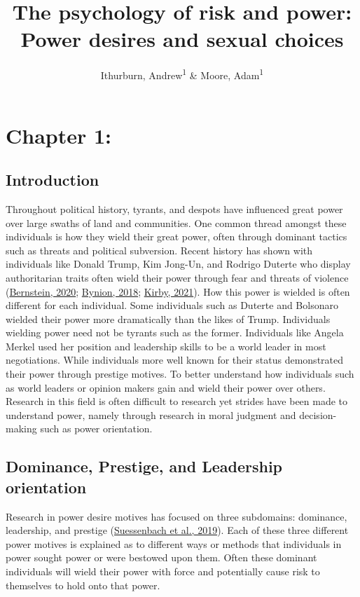 \documentclass[
  donotrepeattitle,doc, 12pt, a4paper,floatsintext]{apa7}
\title{The psychology of risk and power: Power desires and sexual choices}
\author{Ithurburn, Andrew\textsuperscript{1} \& Moore, Adam\textsuperscript{1}}
\date{}
\affiliation{\vspace{0.5cm}\textsuperscript{1} The University of Edinburgh}
\begin{document}
\maketitle

\hypertarget{chapter-1}{%
\section{Chapter 1:}\label{chapter-1}}

\hypertarget{introduction}{%
\subsection{Introduction}\label{introduction}}

Throughout political history, tyrants, and despots have influenced great power over large swaths of land and communities. One common thread amongst these individuals is how they wield their great power, often through dominant tactics such as threats and political subversion. Recent history has shown with individuals like Donald Trump, Kim Jong-Un, and Rodrigo Duterte who display authoritarian traits often wield their power through fear and threats of violence (\protect\hyperlink{ref-bernstein2020}{Bernstein, 2020}; \protect\hyperlink{ref-bynion2018}{Bynion, 2018}; \protect\hyperlink{ref-kirby2021}{Kirby, 2021}). How this power is wielded is often different for each individual. Some individuals such as Duterte and Bolsonaro wielded their power more dramatically than the likes of Trump. Individuals wielding power need not be tyrants such as the former. Individuals like Angela Merkel used her position and leadership skills to be a world leader in most negotiations. While individuals more well known for their status demonstrated their power through prestige motives. To better understand how individuals such as world leaders or opinion makers gain and wield their power over others. Research in this field is often difficult to research yet strides have been made to understand power, namely through research in moral judgment and decision-making such as power orientation.

\hypertarget{dominance-prestige-and-leadership-orientation}{%
\subsection{Dominance, Prestige, and Leadership orientation}\label{dominance-prestige-and-leadership-orientation}}

Research in power desire motives has focused on three subdomains: dominance, leadership, and prestige (\protect\hyperlink{ref-suessenbach2019}{Suessenbach et al., 2019}). Each of these three different power motives is explained as to different ways or methods that individuals in power sought power or were bestowed upon them. Often these dominant individuals will wield their power with force and potentially cause risk to themselves to hold onto that power.
\end{document}
